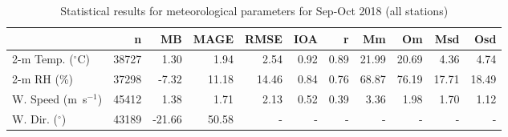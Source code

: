 \begin{table}[ht]
\centering
\caption{Statistical results for meteorological parameters for Sep-Oct 2018 (all stations)}
\label{tab:stats_all}
\begin{tabular}{lrrrrrrrrrr}
\toprule
{} &      n &     MB &   MAGE &   RMSE &   IOA &     r &     Mm &     Om &    Msd &    Osd \\
\midrule
2-m Temp. ($^{\circ}$C) 	&  38727 &   1.30 &   1.94 &   2.54 &  0.92 &  0.89 &  21.99 &  20.69 &   4.36 &   4.74 \\
2-m RH (\%)				&  37298 &  -7.32 &  11.18 &  14.46 &  0.84 &  0.76 &  68.87 &  76.19 &  17.71 &  18.49 \\
W. Speed (m~s$^{-1}$) 	&  45412 &   1.38 &   1.71 &   2.13 &  0.52 &  0.39 &   3.36 &   1.98 &   1.70 &   1.12 \\
W. Dir. ($^{\circ}$) 	&  43189 & -21.66 &  50.58 &      - &     - &     - &      - &      - &      - &      - \\
\bottomrule

\end{tabular}
\end{table}
